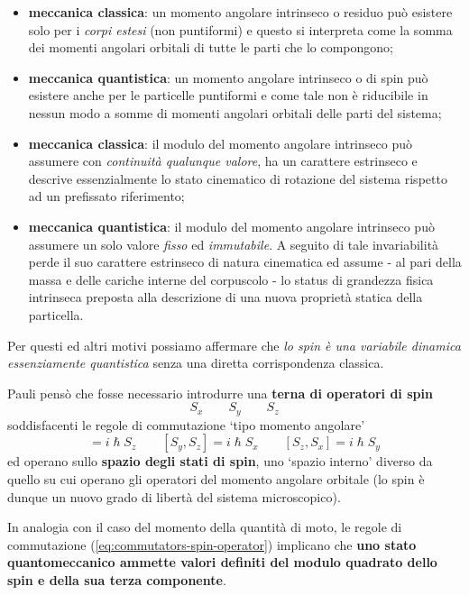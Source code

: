 \begin{itemize}
    \tightlist
    \item
    \textbf{meccanica classica}: un momento angolare intrinseco o residuo
    può esistere solo per i \emph{corpi estesi} (non puntiformi) e questo
    si interpreta come la somma dei momenti angolari orbitali di tutte le
    parti che lo compongono;
    \item
    \textbf{meccanica quantistica}: un momento angolare intrinseco o di
    spin può esistere anche per le particelle puntiformi e come tale non è
    riducibile in nessun modo a somme di momenti angolari orbitali delle
    parti del sistema;
    \item
    \textbf{meccanica classica}: il modulo del momento angolare intrinseco
    può assumere con \emph{continuità qualunque valore}, ha un carattere
    estrinseco e descrive essenzialmente lo stato cinematico di rotazione
    del sistema rispetto ad un prefissato riferimento;
    \item
    \textbf{meccanica quantistica}: il modulo del momento angolare
    intrinseco può assumere un solo valore \emph{fisso} ed
    \emph{immutabile}.
    A seguito di tale invariabilità perde il suo
    carattere estrinseco di natura cinematica ed assume - al pari della
    massa e delle cariche interne del corpuscolo - lo status di grandezza
    fisica intrinseca preposta alla descrizione di una nuova proprietà
    statica della particella.
\end{itemize}

Per questi ed altri motivi possiamo affermare che \emph{lo spin è una
variabile dinamica essenziamente quantistica} senza una diretta
corrispondenza classica.

Pauli pensò che fosse necessario introdurre una \textbf{terna di
operatori di spin} \[
                       S_{x} \qquad S_{y} \qquad S_{z}
\] soddisfacenti le regole di commutazione `tipo momento angolare'
\begin{equation}
[ S_{x},S_{y}] = i \hslash S_{z} \qquad  [ S_{y},S_{z}] = i \hslash S_{x} \qquad   [ S_{z},S_{x}] = i \hslash S_{y}
\label{eq:commutators-spin-operator}
\end{equation}
ed operano sullo \textbf{spazio degli stati di spin}, uno `spazio
interno' diverso da quello su cui operano gli operatori del momento
angolare orbitale (lo spin è dunque un nuovo grado di libertà del
sistema microscopico).

In analogia con il caso del momento della quantità di moto, le regole di
commutazione (\ref{eq:commutators-spin-operator}) implicano che \textbf{uno stato
quantomeccanico ammette valori definiti del modulo quadrato dello spin e
della sua terza componente}.

